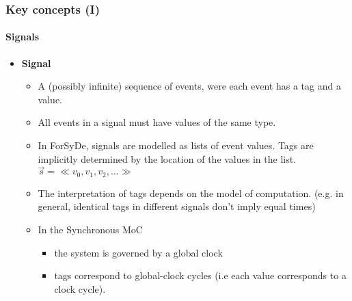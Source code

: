 \documentclass{beamer}
\begin{document}
\beamerdefaultoverlayspecification{}  
\begin{frame}
  \frametitle{Key concepts (I)}
  \framesubtitle{Signals}
  \begin{itemize}
    \item \textbf{Signal} 
      \begin{itemize}
      \item A (possibly infinite) sequence of events, were each event has a tag 
            and a value.
      \item All events in a signal must have values of the same type.
        \pause
      \item In ForSyDe, signals are modelled as lists of event values. Tags
        are implicitly determined by the location of the values in the list.
      \vspace{0.2cm}
      \hspace{3cm}$\overrightarrow{s} = \ll v_0,v_1,v_2,\dots \gg$
      \vspace{0.25cm}
    \pause 
    \item The interpretation of tags depends on the model of computation. 
        (e.g. in  general, identical tags in different signals don't imply equal
        times) 
      \item In the Synchronous MoC 
        \begin{itemize}
        \item the system is governed by a global clock 
        \item tags correspond to global-clock cycles (i.e each value corresponds
          to a clock cycle).
        \end{itemize}
      \end{itemize}
  \end{itemize}
\end{frame}
\end{document}

